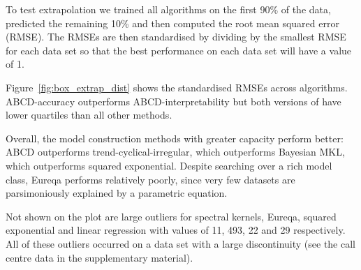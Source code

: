 \documentclass[letterpaper]{article}
\newcommand{\procedurename}{ABCD}
\begin{document}
To test extrapolation we trained all algorithms on the first 90\% of the data, predicted the remaining 10\% and then computed the root mean squared error (RMSE).
The RMSEs are then standardised by dividing by the smallest RMSE for each data set so that the best performance on each data set will have a value of 1.

Figure~\ref{fig:box_extrap_dist} shows the standardised RMSEs across algorithms.
\procedurename{}-accuracy outperforms \procedurename{}-interpretability but both versions of have lower quartiles than all other methods.

Overall, the model construction methods with greater capacity perform better: \procedurename{} outperforms trend-cyclical-irregular, which outperforms Bayesian MKL, which outperforms squared exponential.
Despite searching over a rich model class, Eureqa performs relatively poorly, since very few datasets are parsimoniously explained by a parametric equation.

Not shown on the plot are large outliers for spectral kernels, Eureqa, squared exponential and linear regression with values of 11, 493, 22 and 29 respectively.
All of these outliers occurred on a data set with a large discontinuity (see the call centre data in the supplementary material).


\end{document}

